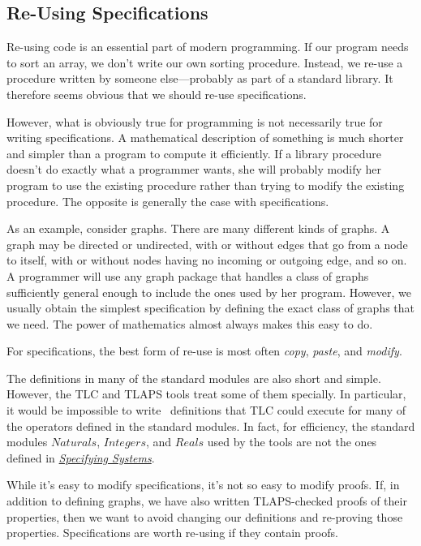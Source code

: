 \documentclass[fleqn,leqno]{article}
\begin{document}
\setlength{\parindent}{1.5em}

\subsection*{Re-Using Specifications}

Re-using code is an essential part of modern programming.  If our
program needs to sort an array, we don't write our own sorting
procedure.  Instead, we re-use a procedure written by someone
else---probably as part of a standard library.  It therefore
seems obvious that we should re-use specifications.

However, what is obviously true for programming is not necessarily
true for writing specifications.  A mathematical description of
something is much shorter and simpler than a program to compute it
efficiently.  If a library procedure doesn't do exactly what a
programmer wants, she will probably modify her program to use the
existing procedure rather than trying to modify the existing
procedure.  The opposite is generally the case with specifications.

As an example, consider graphs.  There are many different kinds of
graphs.  A graph may be directed or undirected, with or without edges
that go from a node to itself, with or without nodes having no
incoming or outgoing edge, and so on.  A programmer will use any graph
package that handles a class of graphs sufficiently general enough to
include the ones used by her program.  However, we usually obtain the
simplest specification by defining the exact class of graphs that we
need.  The power of mathematics almost always makes this easy to do.

For specifications, the best form of re-use is most often \emph{copy},
\emph{paste}, and \emph{modify}.

\bigskip

The definitions in many of the standard modules are also short and
simple.  However, the TLC and TLAPS tools treat some of them
specially.  In particular, it would be impossible to write \tlaplus\
definitions that TLC could execute for many of the operators defined
in the standard modules.  In fact, for efficiency, the standard modules
$Naturals$, $Integers$, and $Reals$ used by the tools are not the ones defined
in 
  \hyperref{http://research.microsoft.com/en-us/um/people/lamport/tla/book.html}{}{}{\emph{Specifying Systems}}.




\bigskip
While it's easy to modify specifications, it's not so easy to modify
proofs.  If, in addition to defining graphs, we have also written
TLAPS-checked proofs of their properties, then we want to avoid
changing our definitions and re-proving those properties.
Specifications are worth re-using if they contain proofs.
\end{document}
